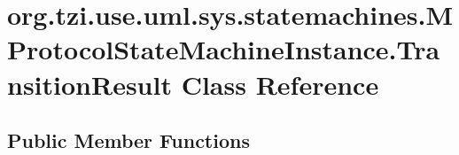 \hypertarget{classorg_1_1tzi_1_1use_1_1uml_1_1sys_1_1statemachines_1_1_m_protocol_state_machine_instance_1_1_transition_result}{\section{org.\-tzi.\-use.\-uml.\-sys.\-statemachines.\-M\-Protocol\-State\-Machine\-Instance.\-Transition\-Result Class Reference}
\label{classorg_1_1tzi_1_1use_1_1uml_1_1sys_1_1statemachines_1_1_m_protocol_state_machine_instance_1_1_transition_result}
}
\subsection*{Public Member Functions}
